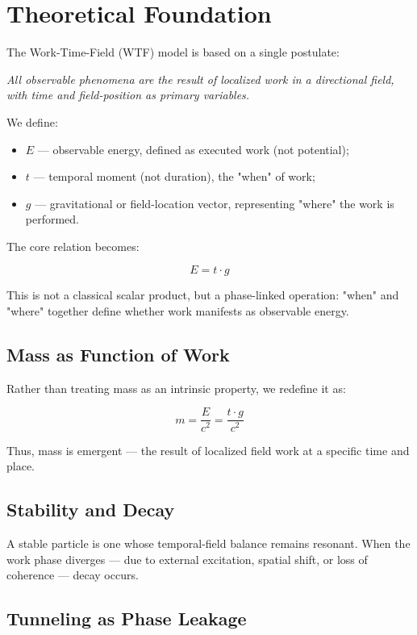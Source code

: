 \section{Theoretical Foundation}

The Work-Time-Field (WTF) model is based on a single postulate:
\begin{center}
    \textit{All observable phenomena are the result of localized work in a directional field, with time and field-position as primary variables.}
\end{center}

We define:

\begin{itemize}
    \item \( E \) — observable energy, defined as executed work (not potential);
    \item \( t \) — temporal moment (not duration), the "when" of work;
    \item \( g \) — gravitational or field-location vector, representing "where" the work is performed.
\end{itemize}

The core relation becomes:

\[
E = t \cdot g
\]

This is not a classical scalar product, but a phase-linked operation: "when" and "where" together define whether work manifests as observable energy.

\subsection{Mass as Function of Work}

Rather than treating mass as an intrinsic property, we redefine it as:

\[
m = \frac{E}{c^2} = \frac{t \cdot g}{c^2}
\]

Thus, mass is emergent — the result of localized field work at a specific time and place.

\subsection{Stability and Decay}

A stable particle is one whose temporal-field balance remains resonant.  
When the work phase diverges — due to external excitation, spatial shift, or loss of coherence — decay occurs.

\subsection{Tunneling as Phase Leakage}


